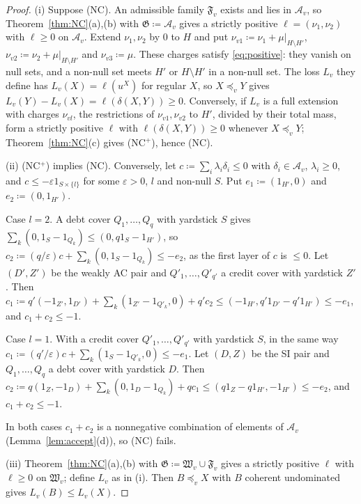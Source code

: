 \documentclass[11pt]{article}
\theoremstyle{definition}\newtheorem{definition}[theorem]{Definition}
\theoremstyle{remark}\newtheorem{remark}[theorem]{Remark}
\begin{document}
\begin{proof}
(i) Suppose (NC). An admissible family $\mathfrak F_v$ exists and lies in
$\mathcal A_v$, so Theorem~\ref{thm:NC}(a),(b) with $\mathfrak
G\coloneqq\mathcal A_v$ gives a strictly positive $\ell=(\nu_1,\nu_2)$ with
$\ell\ge0$ on $\mathcal A_v$. Extend $\nu_1,\nu_2$ by $0$ to $H$ and put
$\nu_{v1}\coloneqq\nu_1+\mu|_{H\setminus H'}$, $\nu_{v2}\coloneqq\nu_2+
\mu|_{H\setminus H'}$ and $\nu_{v3}\coloneqq\mu$. These charges satisfy
\eqref{eq:positive}: they vanish on null sets, and a non-null set meets $H'$
or $H\setminus H'$ in a non-null set. The loss $L_v$ they define has
$L_v(X)=\ell(u^X)$ for regular $X$, so $X\preceq_vY$ gives
$L_v(Y)-L_v(X)=\ell(\delta(X,Y))\ge0$. Conversely, if $L_v$ is a full
extension with charges $\nu_{vl}$, the restrictions of $\nu_{v1},\nu_{v2}$
to $H'$, divided by their total mass, form a strictly positive $\ell$ with
$\ell(\delta(X,Y))\ge0$ whenever $X\preceq_vY$; Theorem~\ref{thm:NC}(c)
gives (NC$^+$), hence (NC).

(ii) (NC$^+$) implies (NC). Conversely, let $c\coloneqq\sum_i\lambda_i
\delta_i\le0$ with $\delta_i\in\mathcal A_v$, $\lambda_i\ge0$, and $c\le
-\varepsilon1_{S\times\{l\}}$ for some $\varepsilon>0$, $l$ and non-null
$S$. Put $e_1\coloneqq(1_{H'},0)$ and $e_2\coloneqq(0,1_{H'})$.

Case $l=2$. A debt cover $Q_1,\dots,Q_q$ with yardstick $S$ gives
$\sum_k(0,1_S-1_{Q_k})\le(0,q1_S-1_{H'})$, so
$c_2\coloneqq(q/\varepsilon)c+\sum_k(0,1_S-1_{Q_k})\le-e_2$, as the first
layer of $c$ is $\le0$. Let $(D',Z')$ be the weakly AC pair and
$Q'_1,\dots,Q'_{q'}$ a credit cover with yardstick $Z'$. Then
$c_1\coloneqq q'(-1_{Z'},1_{D'})+\sum_k(1_{Z'}-1_{Q'_k},0)+q'c_2\le
(-1_{H'},q'1_{D'}-q'1_{H'})\le-e_1$, and $c_1+c_2\le-1$.

Case $l=1$. With a credit cover $Q'_1,\dots,Q'_{q'}$ with yardstick $S$, in
the same way $c_1\coloneqq(q'/\varepsilon)c+\sum_k(1_S-1_{Q'_k},0)\le-e_1$. Let $(D,Z)$ be the SI pair and $Q_1,\dots,Q_q$ a debt cover
with yardstick $D$. Then $c_2\coloneqq q(1_Z,-1_D)+\sum_k(0,1_D-1_{Q_k})
+qc_1\le(q1_Z-q1_{H'},-1_{H'})\le-e_2$, and $c_1+c_2\le-1$.

In both cases $c_1+c_2$ is a nonnegative combination of elements of
$\mathcal A_v$ (Lemma~\ref{lem:accept}(d)), so (NC) fails.

(iii) Theorem~\ref{thm:NC}(a),(b) with $\mathfrak G\coloneqq\mathfrak
W_v\cup\mathfrak F_v$ gives a strictly positive $\ell$ with $\ell\ge0$ on
$\mathfrak W_v$; define $L_v$ as in (i). Then $B\preceq_vX$ with $B$
coherent undominated gives $L_v(B)\le L_v(X)$.
\end{proof}
\end{document}
